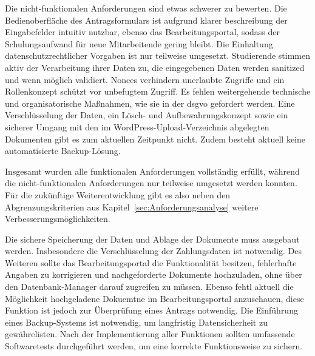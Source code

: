 Die nicht-funktionalen Anforderungen sind etwas schwerer zu bewerten. Die Bedienoberfläche des Antragsformulars ist aufgrund klarer beschreibung der Eingabefelder intuitiv nutzbar, ebenso das Bearbeitungsportal, sodass der Schulungsaufwand für neue Mitarbeitende gering bleibt. Die Einhaltung datenschutzrechtlicher Vorgaben ist nur teilweise umgesetzt. Studierende stimmen aktiv der Verarbeitung ihrer Daten zu, die eingegebenen Daten werden sanitized und wenn möglich validiert. Nonces verhindern unerlaubte Zugriffe und ein Rollenkonzept schützt vor unbefugtem Zugriff. Es fehlen weitergehende technische und organisatorische Maßnahmen, wie sie in der \gls{dsgvo} gefordert werden. Eine Verschlüsselung der Daten, ein Lösch- und Aufbewahrungskonzept sowie ein sicherer Umgang mit den im WordPress-Upload-Verzeichnis abgelegten Dokumenten gibt es zum aktuellen Zeitpunkt nicht. Zudem besteht aktuell keine automatisierte Backup-Lösung. 

Insgesamt wurden alle funktionalen Anforderungen vollständig erfüllt, während die nicht-funktionalen Anforderungen nur teilweise umgesetzt werden konnten. Für die zukünftige Weiterentwicklung gibt es also neben den Abgrenzungskriterien aus Kapitel~\ref{sec:Anforderungsanalyse} weitere Verbesserungsmöglichkeiten.

Die sichere Speicherung der Daten und Ablage der Dokumente muss ausgebaut werden. Insbesondere die Verschlüsselung der Zahlungsdaten ist notwendig. Des Weiteren sollte das Bearbeitungsportal die Funktionalität besitzen, fehlerhafte Angaben zu korrigieren und nachgeforderte Dokumente hochzuladen, ohne über den Datenbank-Manager darauf zugreifen zu müssen. Ebenso fehtl aktuell die Möglichkeit hochgeladene Dokuemtne im Bearbeitungsportal anzuschauen, diese Funktion ist jedoch zur Überprüfung eines Antrags notwendig. Die Einführung eines Backup-Systems ist notwendig, um langfristig Datensicherheit zu gewährelisten. Nach der Implementierung aller Funktionen sollten umfassende Softwaretests durchgeführt werden, um eine korrekte Funktionsweise zu sichern.

